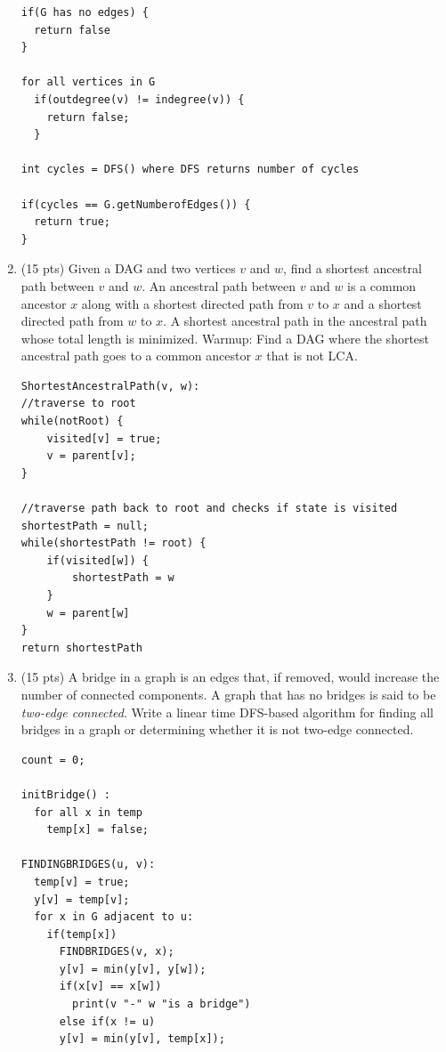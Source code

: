 \documentclass{article}
\begin{document}
\begin{enumerate}
\begin{lstlisting}
if(G has no edges) {
  return false
}

for all vertices in G
  if(outdegree(v) != indegree(v)) {
    return false;
  }
  
int cycles = DFS() where DFS returns number of cycles 

if(cycles == G.getNumberofEdges()) {
  return true;
}
\end{lstlisting}
\newpage

\item (15 pts) Given a DAG and two vertices $v$ and $w$, find a shortest ancestral path between $v$ and $w$. An ancestral path between $v$ and $w$ is a common ancestor $x$ along with a shortest directed path from $v$ to $x$ and a shortest directed path from $w$ to $x$. A shortest ancestral path in the ancestral path whose total length is minimized. Warmup: Find a DAG where the shortest ancestral path goes to a common ancestor $x$ that is not LCA. 

\begin{lstlisting}
ShortestAncestralPath(v, w):
//traverse to root
while(notRoot) {
	visited[v] = true;
	v = parent[v];
}

//traverse path back to root and checks if state is visited
shortestPath = null;
while(shortestPath != root) {
	if(visited[w]) {
		shortestPath = w
	}
	w = parent[w]
}
return shortestPath
\end{lstlisting}



\newpage

\item (15 pts) A bridge in a graph is an edges that, if removed, would increase the number of connected components. A graph that has no bridges is said to be {\em two-edge connected}. Write a linear time DFS-based algorithm for finding all bridges in a graph or determining whether it is not two-edge connected.

\begin{lstlisting}
count = 0;

initBridge() : 
  for all x in temp
    temp[x] = false;
    
FINDINGBRIDGES(u, v):
  temp[v] = true;
  y[v] = temp[v];
  for x in G adjacent to u:
    if(temp[x]) 
      FINDBRIDGES(v, x);
      y[v] = min(y[v], y[w]);
      if(x[v] == x[w]) 
        print(v "-" w "is a bridge")
      else if(x != u) 
      y[v] = min(y[v], temp[x]);
\end{lstlisting}

\newpage


\end{enumerate}
\end{document}
